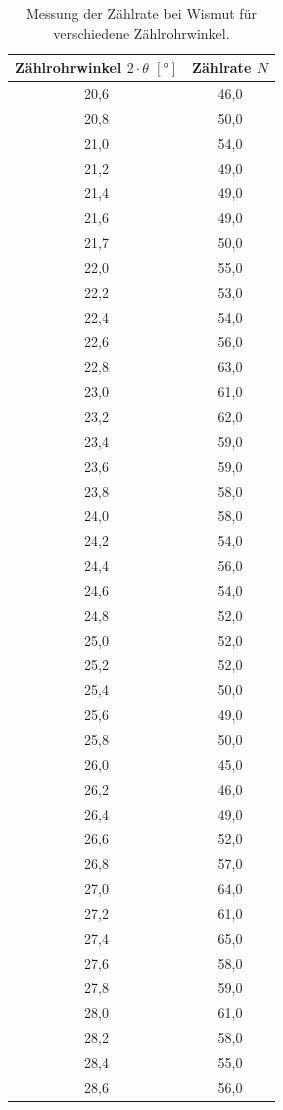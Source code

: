 \begin{table}[H]
  \begin{center}
    \label{tab:wismut}
    \begin{tabular}{c|c} 
        \textbf{Zählrohrwinkel $2 \cdot \theta$ $[°]$} & \textbf{Zählrate $N$}\\
      \hline
      20,6	& 46,0 \\
      20,8	& 50,0 \\
      21,0	& 54,0 \\
      21,2	& 49,0 \\
      21,4	& 49,0 \\
      21,6	& 49,0 \\
      21,7	& 50,0 \\
      22,0	& 55,0 \\
      22,2	& 53,0 \\
      22,4	& 54,0 \\
      22,6	& 56,0 \\
      22,8	& 63,0 \\
      23,0	& 61,0 \\
      23,2	& 62,0 \\
      23,4	& 59,0 \\
      23,6	& 59,0 \\
      23,8	& 58,0 \\
      24,0	& 58,0 \\
      24,2	& 54,0 \\
      24,4	& 56,0 \\
      24,6	& 54,0 \\
      24,8	& 52,0 \\
      25,0	& 52,0 \\
      25,2	& 52,0 \\
      25,4	& 50,0 \\
      25,6	& 49,0 \\
      25,8	& 50,0 \\
      26,0	& 45,0 \\
      26,2	& 46,0 \\
      26,4	& 49,0 \\
      26,6	& 52,0 \\
      26,8	& 57,0 \\
      27,0	& 64,0 \\
      27,2	& 61,0 \\
      27,4	& 65,0 \\
      27,6	& 58,0 \\
      27,8	& 59,0 \\
      28,0	& 61,0 \\
      28,2	& 58,0 \\
      28,4	& 55,0 \\
      28,6	& 56,0
    \end{tabular}
    \caption{Messung der Zählrate bei Wismut für verschiedene Zählrohrwinkel.}
  \end{center}
\end{table}
